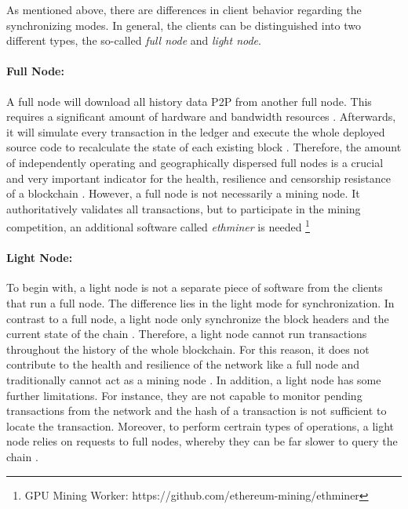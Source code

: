 As mentioned above, there are differences in client behavior regarding the synchronizing modes. 
In general, the clients can be distinguished into two different types, the so-called \textit{full node} and 
\textit{light node}. 

\paragraph{Full Node:} A full node will download all history data P2P from
another full node. This requires a significant amount of hardware and bandwidth resources .
Afterwards, it will simulate every transaction in the ledger
and execute the whole deployed source code to recalculate the state of each existing block .
Therefore, the amount of independently operating and geographically dispersed full nodes 
is a crucial and very important indicator for the health, resilience and 
censorship resistance of a blockchain . 
However, a full node is not necessarily a mining node. It authoritatively validates all transactions, but 
to participate in the mining competition, an additional software called \textit{ethminer}
 is needed \footnote{GPU Mining Worker: https://github.com/ethereum-mining/ethminer}

\paragraph{Light Node:} To begin with, a light node is not a separate piece of software from the clients that 
run a full node. The difference lies in the light mode for synchronization. 
In contrast to a full node, a light node only synchronize the block headers and the 
current state of the chain .
Therefore, a light node cannot run transactions throughout the history of the 
whole blockchain. For this reason, it does not contribute to the health and resilience of 
the network like a full node and traditionally cannot act as a mining node . 
In addition, a light node has some further limitations. For instance, they are not 
capable to monitor pending transactions from the network and the hash of a transaction
is not sufficient to locate the transaction. Moreover, to perform certrain types of operations,
a light node relies on requests to full nodes, whereby they can be far slower to query the chain .


